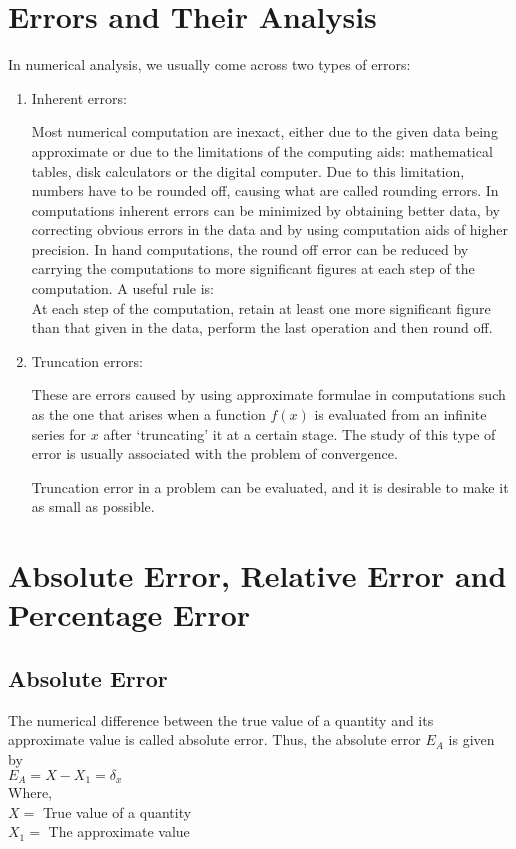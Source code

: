 \documentclass[12pt,class=book,crop=false]{standalone}
\begin{document}
\section{Errors and Their Analysis}
In numerical analysis, we usually come across two types of errors:
\begin{enumerate}
    \item Inherent errors:

          Most numerical computation are inexact, either due to the given data being approximate or due to the limitations of the computing aids: mathematical tables, disk calculators or the digital computer. Due to this limitation, numbers have to be rounded off, causing what are called rounding errors. In computations inherent errors can be minimized by obtaining better data, by correcting obvious errors in the data and by using computation aids of higher precision. In hand computations, the round off error can be reduced by carrying the computations to more significant figures at each step of the computation. A useful rule is:\\
          \indent \indent At each step of the computation, retain at least one more significant figure than that given in the data, perform the last operation and then round off.
    \item Truncation errors:

          These are errors caused by using approximate formulae in computations such as the one that arises when a function \( f(x) \) is evaluated from an infinite series for \( x \) after `truncating' it at a certain stage. The study of this type of error is usually associated with the problem of convergence.

          Truncation error in a problem can be evaluated, and it is desirable to make it as small as possible.
\end{enumerate}
\section{Absolute Error, Relative Error and Percentage Error}
\subsection{Absolute Error}
The numerical difference between the true value of a quantity and its approximate value is called absolute error. Thus, the absolute error \( E_A \) is given by\\
\indent \( E_A=X-X_1=\delta_x \)\\
Where,\\
\indent \( X= \) True value of a quantity\\
\indent \( X_1= \) The approximate value
\end{document}
